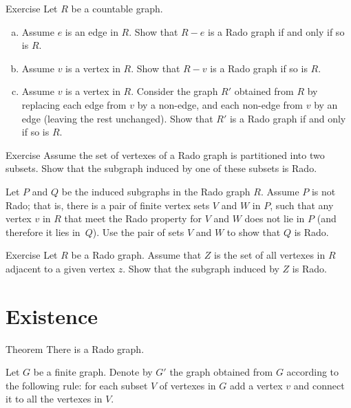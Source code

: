 \begin{thm}{Exercise}
Let $R$ be a countable graph. 
\begin{enumerate}[(a)]
 \item Assume  $e$ is an edge in $R$. 
 Show that $R-e$ is a Rado graph if and only if so is $R$.
 
 \item Assume $v$ is a vertex in $R$. 
 Show that $R-v$ is a Rado graph if so is $R$.
 
 \item Assume $v$ is a vertex in $R$. 
 Consider the graph $R'$ obtained from $R$ by replacing each edge from $v$ by a non-edge, and each non-edge from $v$ by an edge (leaving the rest unchanged).
 Show that $R'$ is a Rado graph if and only if so is $R$. 
\end{enumerate}

\end{thm}

\begin{thm}{Exercise}
Assume the set of vertexes of a Rado graph is partitioned into two subsets.
Show that the subgraph induced by one of these subsets is Rado.
\end{thm}

 Let $P$ and $Q$ be the induced subgraphs in the Rado graph $R$.
Assume $P$ is not Rado; that is, there is a pair of finite vertex sets $V$ and $W$ in $P$, such that any vertex $v$ in $R$ that meet the Rado property for $V$ and $W$ does not lie in $P$ (and therefore it lies in~$Q$).
Use the pair of sets $V$ and $W$ to show that $Q$ is Rado.

\begin{thm}{Exercise}
Let $R$ be a Rado graph.
Assume that $Z$ is the set of all vertexes in $R$ adjacent to a given vertex $z$.
Show that the subgraph induced by $Z$ is Rado.
\end{thm}


\section*{Existence}

\begin{thm}{Theorem}
There is a Rado graph.
\end{thm}

Let $G$ be a finite graph.
Denote by $G'$ the graph obtained from $G$ according to the following rule:
for each subset $V$ of vertexes in $G$ add a vertex $v$ and connect it to all the vertexes in $V$.

